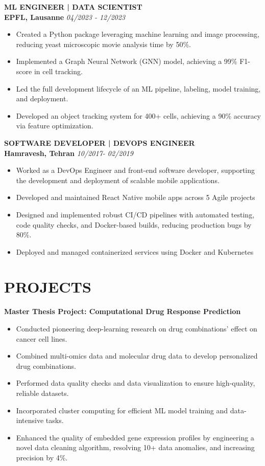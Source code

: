 \documentclass[9pt, letterpaper]{extarticle}
\begin{document}
\begin{minipage}[t]{0.64\textwidth}
\vspace{0.2cm}

\textbf{ML ENGINEER | DATA SCIENTIST} \\
\textbf{EPFL, Lausanne} \hfill \textit{04/2023 - 12/2023}
\small
\begin{itemize}
    \item Created a Python package leveraging machine learning and image processing, reducing yeast microscopic movie analysis time by 50\%.
    \item Implemented a Graph Neural Network (GNN) model, achieving a 99\% F1-score in cell tracking.
    \item Led the full development lifecycle of an ML pipeline, labeling, model training, and deployment.
    \item Developed an object tracking system for 400+ cells, achieving a 90\% accuracy via feature optimization.
\end{itemize}

\vspace{0.2cm}

\textbf{SOFTWARE DEVELOPER | DEVOPS ENGINEER} \\
\textbf{Hamravesh, Tehran} \hfill \textit{10/2017- 02/2019}
\small
\begin{itemize}
    \item Worked as a DevOps Engineer and front-end software developer, supporting the development and deployment of scalable mobile applications.
    \item Developed and maintained React Native mobile apps across 5 Agile projects
    \item Designed and implemented robust CI/CD pipelines with automated testing, code quality checks, and Docker-based builds, reducing production bugs by 80\%.
    \item Deployed and managed containerized services using Docker and Kubernetes
\end{itemize}

\section{PROJECTS}

\textbf{Master Thesis Project: Computational Drug Response Prediction}
\small
\begin{itemize}
    \item Conducted pioneering deep-learning research on drug combinations' effect on cancer cell lines.
    \item Combined multi-omics data and molecular drug data to develop personalized drug combinations.
    \item Performed data quality checks and data visualization to ensure high-quality, reliable datasets.
    \item Incorporated cluster computing for efficient ML model training and data-intensive tasks.
    \item Enhanced the quality of embedded gene expression profiles by engineering a novel data cleaning algorithm, resolving 10+ data anomalies, and increasing precision by 4\%.
\end{itemize}


\end{minipage}
\end{document}
